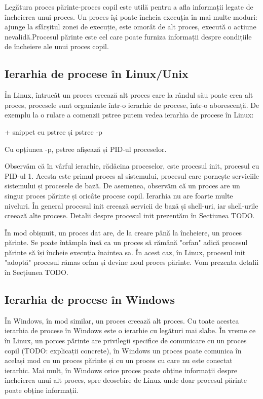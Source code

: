 Legătura proces părinte-proces copil este utilă pentru a afla informații legate
de încheierea unui proces. Un proces își poate încheia execuția în mai multe
moduri: ajunge la sfârșitul zonei de execuție, este omorât de alt proces,
execută o acțiune nevalidă.Procesul părinte este cel care poate furniza
informații despre condițiile de încheiere ale unui proces copil.

\subsection{Ierarhia de procese în Linux/Unix}
\label{sec:procese-ierarhie-linux}

În Linux, întrucât un proces creează alt proces care la rândul său poate crea
alt proces, procesele sunt organizate într-o ierarhie de procese, într-o
aborescență. De exemplu la o rulare a comenzii pstree putem vedea ierarhia de
procese în Linux:

+ snippet cu pstree și pstree -p

Cu opțiunea -p, pstree afișează și PID-ul proceselor.

Observăm că în vârful ierarhie, rădăcina proceselor, este procesul init,
procesul cu PID-ul 1. Acesta este primul proces al sistemului, procesul care
pornește serviciile sistemului și procesele de bază. De asemenea, observăm că un
proces are un singur proces părinte și oricâte procese copil. Ierarhia nu are
foarte multe niveluri. În general procesul init creează servicii de bază și
shell-uri, iar shell-urile creează alte procese. Detalii despre procesul init
prezentăm în Secțiunea TODO.

În mod obișnuit, un proces dat are, de la creare până la încheiere, un proces
părinte. Se poate întâmpla însă ca un proces să rămână "orfan" adică procesul
părinte să își încheie execuția înaintea sa. În acest caz, în Linux, procesul
init "adoptă" procesul rămas orfan și devine noul proces părinte. Vom prezenta
detalii în Secțiunea TODO.

\subsection{Ierarhia de procese în Windows}
\label{sec:procese-ierarhie-windows}

În Windows, în mod similar, un proces creează alt proces. Cu toate acestea
ierarhia de procese în Windows este o ierarhie cu legături mai slabe. În vreme
ce în Linux, un porces părinte are privilegii specifice de comunicare cu un
proces copil (TODO: explicații concrete), în Windows un proces poate comunica în
același mod cu un proces părinte și cu un proces cu care nu este conectat
ierarhic. Mai mult, în Windows orice proces poate obține informații despre
încheierea unui alt proces, spre deosebire de Linux unde doar procesul părinte
poate obține informații.

